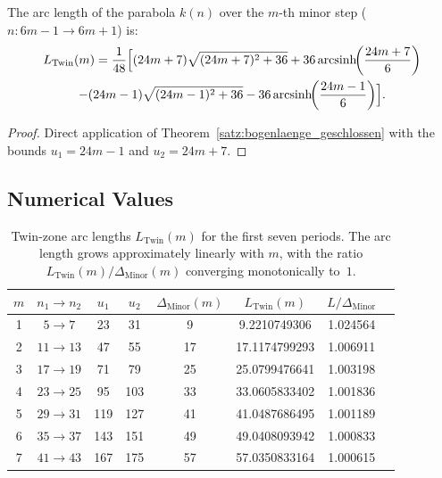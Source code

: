 \begin{theorem}\label{satz:twin_zone}
The arc length of the parabola $k(n)$ over the $m$-th minor step
($n: 6m-1 \to 6m+1$) is:
\begin{multline}
  L_{\mathrm{Twin}}(m)
  = \frac{1}{48}\Bigl[
      (24m+7)\sqrt{(24m+7)^2+36}
    + 36\operatorname{arcsinh}\!\!\left(\frac{24m+7}{6}\right)
    \\
    - (24m-1)\sqrt{(24m-1)^2+36}
    - 36\operatorname{arcsinh}\!\!\left(\frac{24m-1}{6}\right)
    \Bigr].
\end{multline}
\end{theorem}

\begin{proof}
Direct application of Theorem~\ref{satz:bogenlaenge_geschlossen} with the bounds
$u_1 = 24m-1$ and $u_2 = 24m+7$.
\end{proof}

\subsection{Numerical Values}

\begin{table}[H]
\centering
\caption{Twin-zone arc lengths $L_{\mathrm{Twin}}(m)$ for the first
  seven periods. The arc length grows approximately linearly with $m$,
  with the ratio $L_{\mathrm{Twin}}(m) / \Delta_{\mathrm{Minor}}(m)$
  converging monotonically to~$1$.}
\renewcommand{\arraystretch}{1.2}
\begin{tabular}{cccccccc}
\toprule
$m$ & $n_1 \to n_2$ & $u_1$ & $u_2$ &
$\Delta_{\mathrm{Minor}}(m)$ & $L_{\mathrm{Twin}}(m)$ &
$L / \Delta_{\mathrm{Minor}}$ \\
\midrule
1 &  $5 \to  7$ & 23 &  31 &  9 &  9.2210749306 & 1.024564 \\
2 & $11 \to 13$ & 47 &  55 & 17 & 17.1174799293 & 1.006911 \\
3 & $17 \to 19$ & 71 &  79 & 25 & 25.0799476641 & 1.003198 \\
4 & $23 \to 25$ & 95 & 103 & 33 & 33.0605833402 & 1.001836 \\
5 & $29 \to 31$ & 119 & 127 & 41 & 41.0487686495 & 1.001189 \\
6 & $35 \to 37$ & 143 & 151 & 49 & 49.0408093942 & 1.000833 \\
7 & $41 \to 43$ & 167 & 175 & 57 & 57.0350833164 & 1.000615 \\
\bottomrule
\end{tabular}
\end{table}

